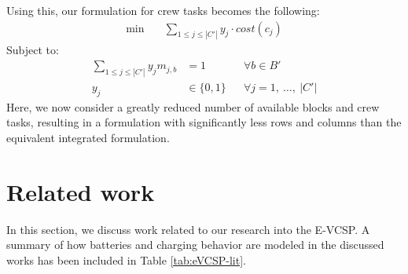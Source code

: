 \documentclass[]{article}
\begin{document}
Using this, our formulation for crew tasks becomes the following:
\begin{align}
\min \quad
& \sum_{1 \leq j \leq |C'|} y_{j} \cdot cost(c_j)  
\end{align}
Subject to:
\begin{align}
\sum_{1 \leq j \leq |C'|} y_j m_{j,b} &= 1  && \forall b \in B' \label{form:all-blocks-covered-seq} \\
y_{j} &\in \{ 0, 1 \} && \forall j = 1,\:\dots,\:|C'|
\end{align}
Here, we now consider a greatly reduced number of available blocks and crew tasks, resulting in a formulation with significantly less rows and columns than the equivalent integrated formulation.

\section{Related work}
In this section, we discuss work related to our research into the E-VCSP. A summary of how batteries and charging behavior are modeled in the discussed works has been included in Table \ref{tab:eVCSP-lit}.
\end{document}
